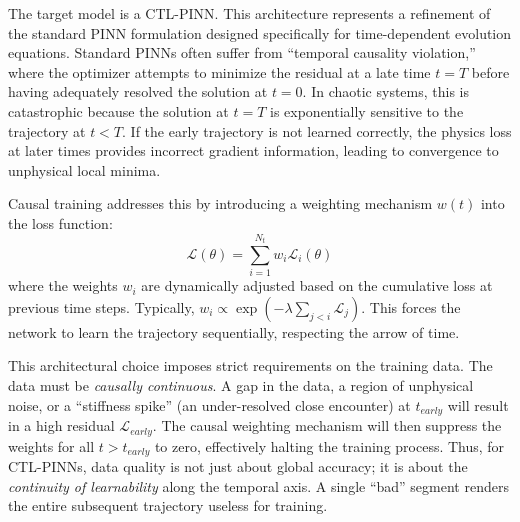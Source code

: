 The target model is a CTL-PINN. This architecture represents a refinement of the standard PINN formulation designed specifically for time-dependent evolution equations. Standard PINNs often suffer from ``temporal causality violation,'' where the optimizer attempts to minimize the residual at a late time $t=T$ before having adequately resolved the solution at $t=0$. In chaotic systems, this is catastrophic because the solution at $t=T$ is exponentially sensitive to the trajectory at $t < T$. If the early trajectory is not learned correctly, the physics loss at later times provides incorrect gradient information, leading to convergence to unphysical local minima.

Causal training addresses this by introducing a weighting mechanism $w(t)$ into the loss function:
\begin{equation}
    \mathcal{L}(\theta) = \sum_{i=1}^{N_t} w_i \mathcal{L}_i(\theta)
\end{equation}
where the weights $w_i$ are dynamically adjusted based on the cumulative loss at previous time steps. Typically, $w_i \propto \exp(-\lambda \sum_{j < i} \mathcal{L}_j)$. This forces the network to learn the trajectory sequentially, respecting the arrow of time.

This architectural choice imposes strict requirements on the training data. The data must be \textit{causally continuous}. A gap in the data, a region of unphysical noise, or a ``stiffness spike'' (an under-resolved close encounter) at $t_{early}$ will result in a high residual $\mathcal{L}_{early}$. The causal weighting mechanism will then suppress the weights for all $t > t_{early}$ to zero, effectively halting the training process. Thus, for CTL-PINNs, data quality is not just about global accuracy; it is about the \textit{continuity of learnability} along the temporal axis. A single ``bad'' segment renders the entire subsequent trajectory useless for training.